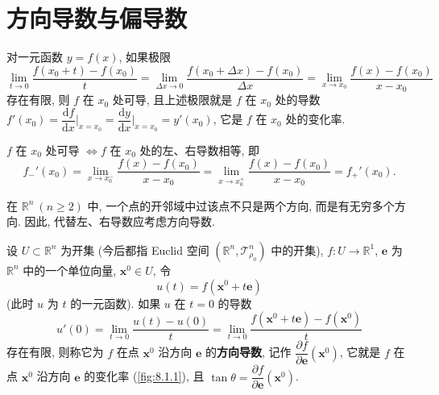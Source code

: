 
\section{方向导数与偏导数}\label{sec:8.1}

对一元函数 $y = f(x)$, 如果极限
\[
  \lim_{t \to 0}\frac{f(x_{0} + t) - f(x_{0})}{t} = \lim_{\Delta x \to 0}\frac{f(x_{0} + \Delta x) - f(x_{0})}{\Delta x} = \lim_{x \to x_{0}}\frac{f(x) - f(x_{0})}{x - x_{0}}
\]
存在有限, 则 $f$ 在 $x_{0}$ 处可导, 且上述极限就是 $f$ 在 $x_{0}$ 处的导数 $f'(x_{0}) = \dfrac{\mathrm{d}f}{\mathrm{d}x}\Big|_{x = x_{0}} = \dfrac{\mathrm{d}y}{\mathrm{d}x}\Big|_{x = x_{0}} = y'(x_{0})$, 它是 $f$ 在 $x_{0}$ 处的变化率.

$f$ 在 $x_{0}$ 处可导 $\iff f$ 在 $x_{0}$ 处的左、右导数相等, 即
\[
  f_{-}'(x_{0}) = \lim_{x \to x_{0}^{-}}\frac{f(x) - f(x_{0})}{x - x_{0}} = \lim_{x \to x_{0}^{+}}\frac{f(x) - f(x_{0})}{x - x_{0}} = f_{+}'(x_{0}).
\]

在 $\mathbb{R}^{n}\ (n \geqslant 2)$ 中, 一个点的开邻域中过该点不只是两个方向, 而是有无穷多个方向. 因此, 代替左、右导数应考虑方向导数.

\begin{definition}\label{def:8.1.1}
设 $U \subset \mathbb{R}^{n}$ 为开集 (今后都指 Euclid 空间 $(\mathbb{R}^{n}, \mathcal{T}_{\rho_{0}}^{n})$ 中的开集), $f: U \to \mathbb{R}^{1}$, $\boldsymbol{e}$ 为 $\mathbb{R}^{n}$ 中的一个单位向量, $\boldsymbol{x}^{0} \in U$, 令
\[
  u(t) = f(\boldsymbol{x}^{0} + t\boldsymbol{e})
\]
(此时 $u$ 为 $t$ 的一元函数). 如果 $u$ 在 $t = 0$ 的导数
\[
  u'(0) = \lim_{t \to 0}\frac{u(t) - u(0)}{t} = \lim_{t \to 0}\frac{f(\boldsymbol{x}^{0} + t\boldsymbol{e}) - f(\boldsymbol{x}^{0})}{t}
\]
存在有限, 则称它为 $f$ 在点 $\boldsymbol{x}^{0}$ 沿方向 $\boldsymbol{e}$ 的\textbf{方向导数}, 记作 $\dfrac{\partial f}{\partial \boldsymbol{e}}(\boldsymbol{x}^{0})$, 它就是 $f$ 在点 $\boldsymbol{x}^{0}$ 沿方向 $\boldsymbol{e}$ 的变化率 (\cref{fig:8.1.1}), 且 $\tan\theta = \dfrac{\partial f}{\partial \boldsymbol{e}}(\boldsymbol{x}^{0})$.
\end{definition}

